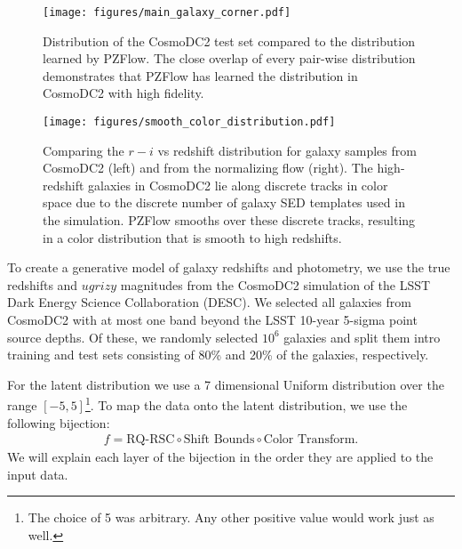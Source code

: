 \documentclass[twocolumn,twocolappendix]{aastex631}
\begin{document}
\begin{figure*}[t]
    \begin{centering}
        \texttt{[image: figures/main\_galaxy\_corner.pdf]}
        \caption{
            Distribution of the CosmoDC2 test set compared to the distribution learned by PZFlow.
            The close overlap of every pair-wise distribution demonstrates that PZFlow has learned the distribution in CosmoDC2 with high fidelity.
        }
        \label{fig:main-corner}
    \end{centering}
\end{figure*}

\begin{figure*}[t]
    \begin{centering}
        \texttt{[image: figures/smooth\_color\_distribution.pdf]}
        \caption{
            Comparing the $r-i$ vs redshift distribution for galaxy samples from CosmoDC2 (left) and from the normalizing flow (right).
            The high-redshift galaxies in CosmoDC2 lie along discrete tracks in color space due to the discrete number of galaxy SED templates used in the simulation.
            PZFlow smooths over these discrete tracks, resulting in a color distribution that is smooth to high redshifts.
        }
        \label{fig:smooth-color-dist}
    \end{centering}
\end{figure*}

To create a generative model of galaxy redshifts and photometry, we use the true redshifts and $ugrizy$ magnitudes from the CosmoDC2 simulation \citep{dc2, cosmodc2} of the LSST Dark Energy Science Collaboration (DESC).
We selected all galaxies from CosmoDC2 with at most one band beyond the LSST 10-year 5-sigma point source depths.
Of these, we randomly selected $10^6$ galaxies and split them intro training and test sets consisting of 80\% and 20\% of the galaxies, respectively.

For the latent distribution we use a 7 dimensional Uniform distribution over the range $[-5, 5]$\footnote{The choice of 5 was arbitrary. Any other positive value would work just as well.}.
To map the data onto the latent distribution, we use the following bijection:
\begin{align}
    f = \text{RQ-RSC} \circ \text{Shift Bounds} \circ \text{Color Transform}.
\end{align}
We will explain each layer of the bijection in the order they are applied to the input data.
\end{document}

